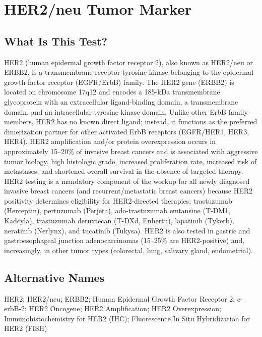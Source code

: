 \chapter{HER2/neu Tumor Marker}

\section*{What Is This Test?}
HER2 (human epidermal growth factor receptor 2), also known as HER2/neu or ERBB2, is a transmembrane receptor tyrosine kinase belonging to the epidermal growth factor receptor (EGFR/ErbB) family. The HER2 gene (ERBB2) is located on chromosome 17q12 and encodes a 185-kDa transmembrane glycoprotein with an extracellular ligand-binding domain, a transmembrane domain, and an intracellular tyrosine kinase domain. Unlike other ErbB family members, HER2 has no known direct ligand; instead, it functions as the preferred dimerization partner for other activated ErbB receptors (EGFR/HER1, HER3, HER4). HER2 amplification and/or protein overexpression occurs in approximately 15--20\% of invasive breast cancers and is associated with aggressive tumor biology, high histologic grade, increased proliferation rate, increased risk of metastases, and shortened overall survival in the absence of targeted therapy. HER2 testing is a mandatory component of the workup for all newly diagnosed invasive breast cancers (and recurrent/metastatic breast cancers) because HER2 positivity determines eligibility for HER2-directed therapies: trastuzumab (Herceptin), pertuzumab (Perjeta), ado-trastuzumab emtansine (T-DM1, Kadcyla), trastuzumab deruxtecan (T-DXd, Enhertu), lapatinib (Tykerb), neratinib (Nerlynx), and tucatinib (Tukysa). HER2 is also tested in gastric and gastroesophageal junction adenocarcinomas (15--25\% are HER2-positive) and, increasingly, in other tumor types (colorectal, lung, salivary gland, endometrial).

\section*{Alternative Names}
HER2; HER2/neu; ERBB2; Human Epidermal Growth Factor Receptor 2; c-erbB-2; HER2 Oncogene; HER2 Amplification; HER2 Overexpression; Immunohistochemistry for HER2 (IHC); Fluorescence In Situ Hybridization for HER2 (FISH)

